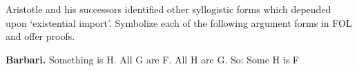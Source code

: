 \problempart
\label{pr.BarbaraEtc.proof2}
Aristotle and his successors identified other syllogistic forms which depended upon `existential import'. Symbolize each of the following argument forms in FOL and offer proofs.
\begin{earg}
\newpage	\item \textbf{Barbari.} Something is H. All G are F. All H are G. So: Some H is F
	\\
	

\end{earg}
